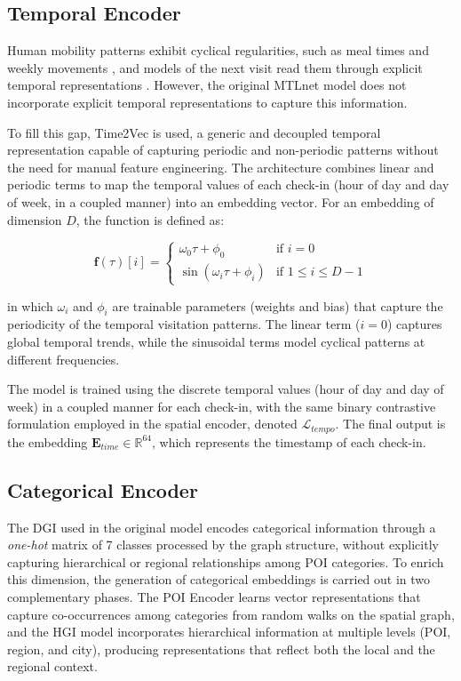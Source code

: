 \subsection{Temporal Encoder}

Human mobility patterns exhibit cyclical regularities, such as meal times and weekly movements \cite{cho2011gowalla}, and models of the next visit read them through explicit temporal representations \cite{sun2020go}. However, the original MTLnet model does not incorporate explicit temporal representations to capture this information.

To fill this gap, Time2Vec \cite{kazemi2019time2vec} is used, a generic and decoupled temporal representation capable of capturing periodic and non-periodic patterns without the need for manual feature engineering. The architecture combines linear and periodic terms to map the temporal values of each check-in (hour of day and day of week, in a coupled manner) into an embedding vector. For an embedding of dimension $D$, the function is defined as:

\begin{equation}
\mathbf{f}(\tau)[i] = \begin{cases} \omega_0 \tau + \phi_0 & \text{if } i=0 \\ \sin(\omega_i \tau + \phi_i) & \text{if } 1 \leq i \leq D-1 \end{cases}
\label{eq:courb:time2vec}
\end{equation}

in which $\omega_i$ and $\phi_i$ are trainable parameters (weights and bias) that capture the periodicity of the temporal visitation patterns. The linear term ($i=0$) captures global temporal trends, while the sinusoidal terms model cyclical patterns at different frequencies.

The model is trained using the discrete temporal values (hour of day and day of week) in a coupled manner for each check-in, with the same binary contrastive formulation employed in the spatial encoder, denoted $\mathcal{L}_{tempo}$. The final output is the embedding $\mathbf{E}_{time} \in \mathbb{R}^{64}$, which represents the timestamp of each check-in.

\subsection{Categorical Encoder}

The DGI used in the original model encodes categorical information through a \textit{one-hot} matrix of 7 classes processed by the graph structure, without explicitly capturing hierarchical or regional relationships among POI categories. To enrich this dimension, the generation of categorical embeddings is carried out in two complementary phases. The POI Encoder learns vector representations that capture co-occurrences among categories from random walks on the spatial graph, and the HGI model \cite{huang2023hgi} incorporates hierarchical information at multiple levels (POI, region, and city), producing representations that reflect both the local and the regional context.

